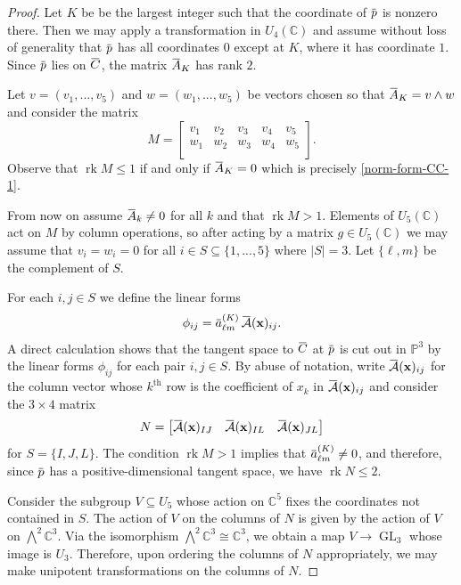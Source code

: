 \documentclass[11pt]{amsart}
\numberwithin{theorem}{section}
\numberwithin{equation}{section}
\theoremstyle{definition}\newtheorem{defn}[theorem]{Definition}
\theoremstyle{definition}\newtheorem{remark}[theorem]{Remark}
\theoremstyle{definition}\newtheorem{question}[theorem]{Question}
\theoremstyle{definition}\newtheorem{problem}[theorem]{Problem}
\newcommand{\CC}{\mathbb{C}}
\newcommand{\PP}{\mathbb{P}}
\newcommand{\cA}{\mathcal{A}}
\newcommand{\overbar}[1]{\mkern 1.5mu\overline{\mkern-1.5mu#1\mkern-1.5mu}\mkern 1.5mu}
\DeclareMathOperator{\rank}{rk}
\DeclareMathOperator{\GL}{GL}
\renewcommand{\subset}{\subseteq}
\newcommand{\I}{I}
\newcommand{\J}{J}
\newcommand{\K}{K}
\renewcommand{\L}{L}
\begin{document}
\begin{proof}
Let $\K$ be be the largest integer such that the coordinate of $\overbar{p}$ is nonzero there. Then we may apply a transformation in $U_4(\CC)$ and assume without loss of generality that $\overbar{p}$ has all coordinates $0$ except at $\K$, where it has coordinate $1$. Since $\overbar{p}$ lies on $\overbar{C}$, the matrix $\overbar{A}_\K$ has rank $2$.

Let $v = (v_1, ..., v_5)$ and $w = (w_1, ..., w_5)$ be vectors chosen so that $\overbar{A}_{\K} =  v \wedge w$ and consider the matrix
\[
    M = \begin{bmatrix}
        v_1 & v_2 & v_3 & v_4 & v_5 \\
        w_1 & w_2 & w_3 & w_4 & w_5 \\
    \end{bmatrix}.
\]
Observe that $\rank M \leq 1$ if and only if $\overbar{A}_\K = 0$ which is precisely \ref{norm-form-CC-1}. 

From now on assume $\overbar{A}_k \neq 0$ for all $k$ and that $\rank M > 1$. Elements of $U_5(\CC)$ act on $M$ by column operations, so after acting by a matrix $g \in U_5(\CC)$ we may assume that $v_i = w_i = 0$ for all $i \in S \subset \{1, ..., 5\}$ where $|S| = 3$. Let $\{\ell,m\}$ be the complement of $S$.

For each $i,j \in S$ we define the linear forms
\[
\phi_{ij} = \overbar{a}_{\ell m}^{(\K)} \, \overbar{\cA}(\mathbf{x})_{ij}.
\]
A direct calculation shows that the tangent space to $\overbar{C}$ at $\overbar{p}$ is cut out in $\PP^3$ by the linear forms $\phi_{ij}$ for each pair $i,j \in S$. By abuse of notation, write $\overbar{\cA}(\mathbf{x})_{ij}$ for the column vector whose $k^{\text{th}}$ row is the coefficient of $x_k$ in $\overbar{\cA}(\mathbf{x})_{ij}$ and consider the $3 \times 4$ matrix
\[
    N = \begin{bmatrix}
        \overbar{\cA}(\mathbf{x})_{\I\J} & \overbar{\cA}(\mathbf{x})_{\I\L} & \overbar{\cA}(\mathbf{x})_{\J\L}
    \end{bmatrix}
\]
for $S = \{\I,\J,\L\}$. The condition $\rank M > 1$ implies that $\overbar{a}_{\ell m}^{(\K)} \neq 0$, and therefore, since $\overbar{p}$ has a positive-dimensional tangent space, we have $\rank N \leq 2$.

Consider the subgroup $V \subseteq U_5$ whose action on $\CC^5$ fixes the coordinates not contained in $S$. The action of $V$ on the columns of $N$ is given by the action of $V$ on $\bigwedge^2 \CC^3$. Via the isomorphism $\bigwedge^2 \CC^3 \cong \CC^3$, we obtain a map $V \rightarrow \GL_3$ whose image is $U_3$. Therefore, upon ordering the columns of $N$ appropriately, we may make unipotent transformations on the columns of $N$.


\end{proof}
\end{document}

